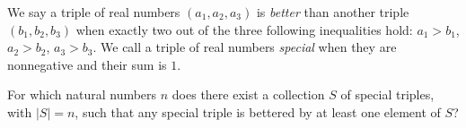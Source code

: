 We say a triple of real numbers \( (a_1,a_2,a_3)\) is \textit{better} than another triple \( (b_1,b_2,b_3)\) when exactly two out of the three following inequalities hold: \( a_1 > b_1\), \( a_2 > b_2\), \( a_3 > b_3\). We call a triple of real numbers \textit{special} when they are nonnegative and their sum is \( 1\).

For which natural numbers \( n\) does there exist a collection \( S\) of special triples, with \( |S| = n\), such that any special triple is bettered by at least one element of \( S\)?